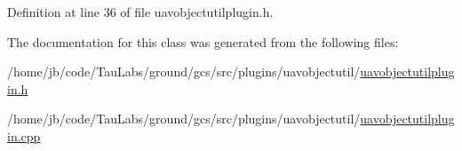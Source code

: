 \-Definition at line 36 of file uavobjectutilplugin.\-h.



\-The documentation for this class was generated from the following files\-:\begin{DoxyCompactItemize}
\item 
/home/jb/code/\-Tau\-Labs/ground/gcs/src/plugins/uavobjectutil/\hyperlink{uavobjectutilplugin_8h}{uavobjectutilplugin.\-h}\item 
/home/jb/code/\-Tau\-Labs/ground/gcs/src/plugins/uavobjectutil/\hyperlink{uavobjectutilplugin_8cpp}{uavobjectutilplugin.\-cpp}\end{DoxyCompactItemize}
